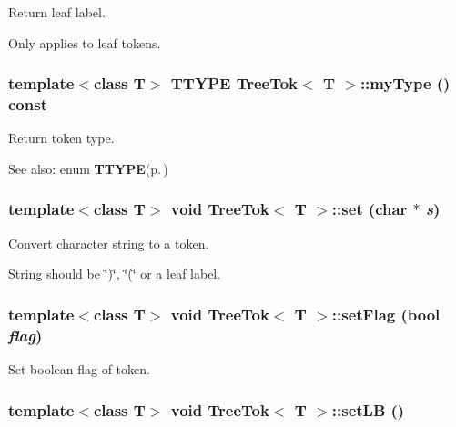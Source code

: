 Return leaf label. 

Only applies to leaf tokens. 
\subsubsection{\setlength{\rightskip}{0pt plus 5cm}template$<$class T$>$ {\bf TTYPE} {\bf Tree\-Tok}$<$ T $>$::my\-Type () const\hspace{0.3cm}{\tt  [inline]}}\label{structTreeTok_a0}


Return token type. 

\begin{Desc}
\item[See also:]enum {\bf TTYPE}{\rm (p.\,\pageref{treetok_8h_a4})} \end{Desc}
\subsubsection{\setlength{\rightskip}{0pt plus 5cm}template$<$class T$>$ void {\bf Tree\-Tok}$<$ T $>$::set (char $\ast$ {\em s})\hspace{0.3cm}{\tt  [inline]}}\label{structTreeTok_a7}


Convert character string to a token. 

String should be \char`\"{})\char`\"{}, \char`\"{}(\char`\"{} or a leaf label. 
\subsubsection{\setlength{\rightskip}{0pt plus 5cm}template$<$class T$>$ void {\bf Tree\-Tok}$<$ T $>$::set\-Flag (bool {\em flag})\hspace{0.3cm}{\tt  [inline]}}\label{structTreeTok_a6}


Set boolean flag of token. 

\subsubsection{\setlength{\rightskip}{0pt plus 5cm}template$<$class T$>$ void {\bf Tree\-Tok}$<$ T $>$::set\-LB ()\hspace{0.3cm}{\tt  [inline]}}\label{structTreeTok_a3}


